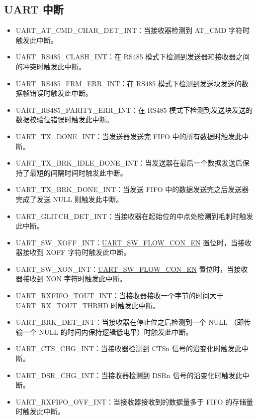\documentclass[main\_\_CN.tex]{subfiles}
\begin{document}
\subsection{UART 中断}
\begin{itemize}
\item \label{int:UARTATCMDCHARDETINT}UART\_AT\_CMD\_CHAR\_DET\_INT：当接收器检测到 AT\_CMD 字符时触发此中断。
\item \label{int:UARTRS485CLASHINT}UART\_RS485\_CLASH\_INT：在 RS485 模式下检测到发送器和接收器之间的冲突时触发此中断。
\item \label{int:UARTRS485FRMERRINT}UART\_RS485\_FRM\_ERR\_INT：在 RS485 模式下检测到发送块发送的数据帧错误时触发此中断。
\item \label{int:UARTRS485PARITYERRINT}UART\_RS485\_PARITY\_ERR\_INT：在 RS485 模式下检测到发送块发送的数据校验位错误时触发此中断。
\item \label{int:UARTTXDONEINT}UART\_TX\_DONE\_INT：当发送器发送完 FIFO 中的所有数据时触发此中断。
\item \label{int:UARTTXBRKIDLEDONEINT}UART\_TX\_BRK\_IDLE\_DONE\_INT：当发送器在最后一个数据发送后保持了最短的间隔时间时触发此中断。
\item \label{int:UARTTXBRKDONEINT}UART\_TX\_BRK\_DONE\_INT：当发送 FIFO 中的数据发送完之后发送器完成了发送 NULL 则触发此中断。
\item \label{int:UARTGLITCHDETINT}UART\_GLITCH\_DET\_INT：当接收器在起始位的中点处检测到毛刺时触发此中断。
\item \label{int:UARTSWXOFFINT}UART\_SW\_XOFF\_INT：\hyperref[fielddesc:UARTSWFLOWCONEN]{UART\_SW\_FLOW\_CON\_EN} 置位时，当接收器接收到 XOFF 字符时触发此中断。
\item \label{int:UARTSWXONINT}UART\_SW\_XON\_INT：\hyperref[fielddesc:UARTSWFLOWCONEN]{UART\_SW\_FLOW\_CON\_EN} 置位时，当接收器接收到 XON 字符时触发此中断。
\item \label{int:UARTRXFIFOTOUTINT}UART\_RXFIFO\_TOUT\_INT：当接收器接收一个字节的时间大于 \hyperref[fielddesc:UARTRXTOUTTHRHD]{UART\_RX\_TOUT\_THRHD} 时触发此中断。
\item \label{int:UARTBRKDETINT}UART\_BRK\_DET\_INT：当接收器在停止位之后检测到一个 NULL （即传输一个 NULL 的时间内保持逻辑低电平）时触发此中断。
\item \label{int:UARTCTSCHGINT}UART\_CTS\_CHG\_INT：当接收器检测到 CTSn 信号的沿变化时触发此中断。
\item \label{int:UARTDSRCHGINT}UART\_DSR\_CHG\_INT：当接收器检测到 DSRn 信号的沿变化时触发此中断。
\item \label{int:UARTRXFIFOOVFINT}UART\_RXFIFO\_OVF\_INT：当接收器接收到的数据量多于 FIFO 的存储量时触发此中断。

\end{itemize}
\end{document}
